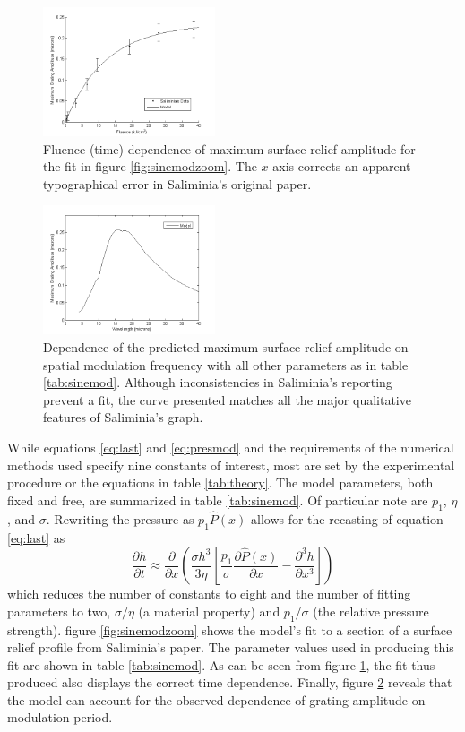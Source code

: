 \documentclass[twocolumn,showpacs,preprintnumbers,amsmath,amssymb]{revtex4}
\begin{document}
\begin{figure}[!htbp]
  \includegraphics[width=2in]{figure/saliminiagrowth.png}
  \caption{Fluence (time) dependence of maximum surface relief amplitude for the fit in figure \ref{fig:sinemodzoom}. The $x$ axis corrects an apparent typographical error in Saliminia's original paper.}
  \label{fig:salgrowth}
\end{figure}

\begin{figure}[!htbp]
  \includegraphics[width=2in]{figure/saliminiadisp.png}
  \caption{Dependence of the predicted maximum surface relief amplitude on spatial modulation frequency with all other parameters as in table \ref{tab:sinemod}. Although inconsistencies in Saliminia's reporting prevent a fit, the curve presented matches all the major qualitative features of Saliminia's graph.}
  \label{fig:saldisp}
\end{figure}


While equations \ref{eq:last} and \ref{eq:presmod} and the requirements of the numerical
methods used specify nine constants of interest, most are set by the experimental
procedure or the equations in table \ref{tab:theory}. The model parameters, both fixed
and free, are summarized in table \ref{tab:sinemod}. Of particular note are $p_1$,
$\eta$, and $\sigma$. Rewriting the pressure as $p_1 \hat{P}(x)$ allows for the recasting
of equation \ref{eq:last} as
\begin{equation}
\frac{\partial h}{\partial t} \approx \frac{\partial}{\partial x}\left(\frac{\sigma
h^3}{3\eta}\left[\frac{p_1}{\sigma}\frac{\partial \hat{P}(x)}{\partial
x}-\frac{\partial^3 h}{\partial x^3}\right]\right) \label{eq:fitmodel}
\end{equation}
which reduces the number of constants to eight and the number of fitting parameters to
two, $\sigma/\eta$ (a material property) and $p_1/\sigma$ (the relative pressure
strength). figure \ref{fig:sinemodzoom} shows the model's fit to a section of a surface
relief profile from Saliminia's paper. The parameter values used in producing this fit
are shown in table \ref{tab:sinemod}. As can be seen from figure \ref{fig:salgrowth}, the
fit thus produced also displays the correct time dependence. Finally, figure
\ref{fig:saldisp} reveals that the model can account for the observed dependence of
grating amplitude on modulation period.
\end{document}
